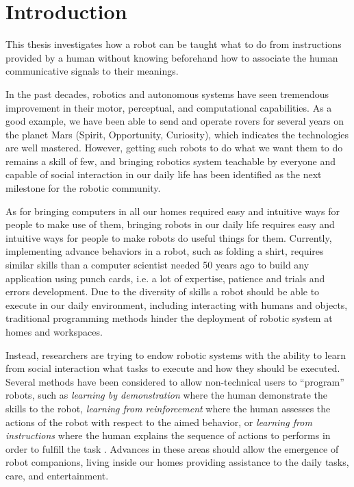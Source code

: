 
\chapter{Introduction}
\label{chapter:introduction}
\minitoc

This thesis investigates how a robot can be taught what to do from instructions provided by a human without knowing beforehand how to associate the human communicative signals to their meanings.

In the past decades, robotics and autonomous systems have seen tremendous improvement in their motor, perceptual, and computational capabilities. As a good example, we have been able to send and operate rovers for several years on the planet Mars (Spirit, Opportunity, Curiosity), which indicates the technologies are well mastered. However, getting such robots to do what we want them to do remains a skill of few, and bringing robotics system teachable by everyone and capable of social interaction in our daily life has been identified as the next milestone for the robotic community.

As for bringing computers in all our homes required easy and intuitive ways for people to make use of them, bringing robots in our daily life requires easy and intuitive ways for people to make robots do useful things for them. Currently, implementing advance behaviors in a robot, such as folding a shirt, requires similar skills than a computer scientist needed 50 years ago to build any application using punch cards, i.e. a lot of expertise, patience and trials and errors development. Due to the diversity of skills a robot should be able to execute in our daily environment, including interacting with humans and objects, traditional programming methods hinder the deployment of robotic system at homes and workspaces.

Instead, researchers are trying to endow robotic systems with the ability to learn from social interaction what tasks to execute and how they should be executed. Several methods have been considered to allow non-technical users to ``program'' robots, such as \emph{learning by demonstration} where the human demonstrate the skills to the robot, \emph{learning from reinforcement} where the human assesses the actions of the robot with respect to the aimed behavior, or \emph{learning from instructions} where the human explains the sequence of actions to performs in order to fulfill the task . Advances in these areas should allow the emergence of robot companions, living inside our homes providing assistance to the daily tasks, care, and entertainment. 

